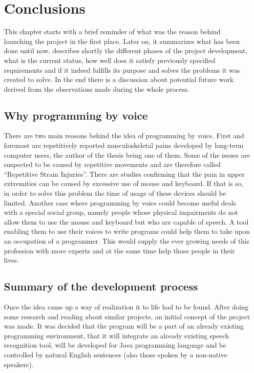 \chapter{Conclusions}
\label{cha:Conclusions}

This chapter starts with a brief reminder of what was the reason behind launching the project in the first place. Later on, it summarizes what has been done until now, describes shortly the different phases of the project development, what is the current status, how well does it satisfy previously specified requirements and if it indeed fulfills its purpose and solves the problems it was created to solve. In the end there is a discussion about potential future work derived from the observations made during the whole process.

\section{Why programming by voice}

There are two main reasons behind the idea of programming by voice. First and foremost are repetitively reported musculoskeletal pains developed by long-term computer users, the author of the thesis being one of them. Some of the issues are suspected to be caused by repetitive movements and are therefore called ``Repetitive Strain Injuries''. There are studies confirming that the pain in upper extremities can be caused by excessive use of mouse and keyboard. If that is so, in order to solve this problem the time of usage of these devices should be limited. 
Another case where programming by voice could become useful deals with a special social group, namely people whose physical impairments do not allow them to use the mouse and keyboard but who are capable of speech. A tool enabling them to use their voices to write programs could help them to take upon an occupation of a programmer. This would supply the ever growing needs of this profession with more experts and at the same time help those people in their lives.

\section{Summary of the development process}
Once the idea came up a way of realization it to life had to be found. After doing some research and reading about similar projects, an initial concept of the project was made. It was decided that the program will be a part of an already existing programming environment, that it will integrate an already existing speech recognition tool, will be developed for Java programming language and be controlled by natural English sentences (also those spoken by a non-native speakers). 


